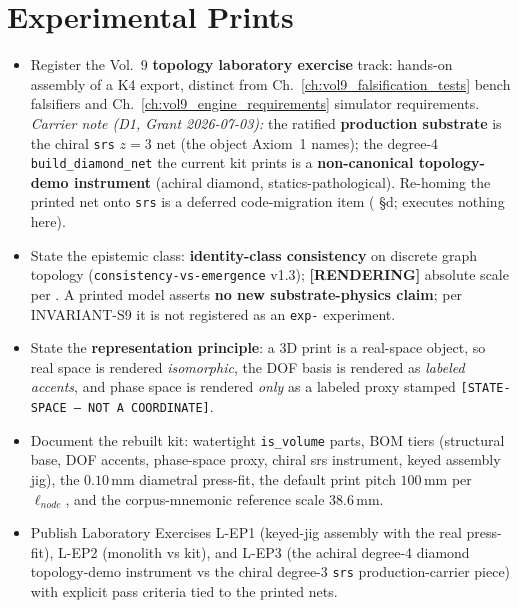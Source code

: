 \chapter{Experimental Prints}
\label{ch:vol9_experimental_prints}

\begin{objectivebox}
\begin{itemize}
    \item Register the Vol.~9 \textbf{topology laboratory exercise} track: hands-on assembly of a K4 export, distinct from Ch.~\ref{ch:vol9_falsification_tests} bench falsifiers and Ch.~\ref{ch:vol9_engine_requirements} simulator requirements. \emph{Carrier note (D1, Grant 2026-07-03):} the ratified \textbf{production substrate} is the chiral \texttt{srs} $z=3$ net (the object Axiom~1 names); the degree-4 \texttt{build\_diamond\_net} the current kit prints is a \textbf{non-canonical topology-demo instrument} (achiral diamond, statics-pathological). Re-homing the printed net onto \texttt{srs} is a deferred code-migration item ( §d; executes nothing here).
    \item State the epistemic class: \textbf{identity-class consistency} on discrete graph topology (\texttt{consistency-vs-emergence} v1.3); \textbf{[RENDERING]} absolute scale per . A printed model asserts \textbf{no new substrate-physics claim}; per INVARIANT-S9 it is not registered as an \texttt{exp-} experiment.
    \item State the \textbf{representation principle}: a 3D print is a real-space object, so real space is rendered \emph{isomorphic}, the DOF basis is rendered as \emph{labeled accents}, and phase space is rendered \emph{only} as a labeled proxy stamped \texttt{[STATE-SPACE --- NOT A COORDINATE]}.
    \item Document the rebuilt kit: watertight \texttt{is\_volume} parts, BOM tiers (structural base, DOF accents, phase-space proxy, chiral srs instrument, keyed assembly jig), the $0.10\,\mathrm{mm}$ diametral press-fit, the default print pitch $100\,\mathrm{mm}$ per $\ell_{node}$, and the corpus-mnemonic reference scale $38.6\,\mathrm{mm}$.
    \item Publish Laboratory Exercises L-EP1 (keyed-jig assembly with the real press-fit), L-EP2 (monolith vs kit), and L-EP3 (the achiral degree-4 diamond topology-demo instrument vs the chiral degree-3 \texttt{srs} production-carrier piece) with explicit pass criteria tied to the printed nets.
\end{itemize}
\end{objectivebox}

